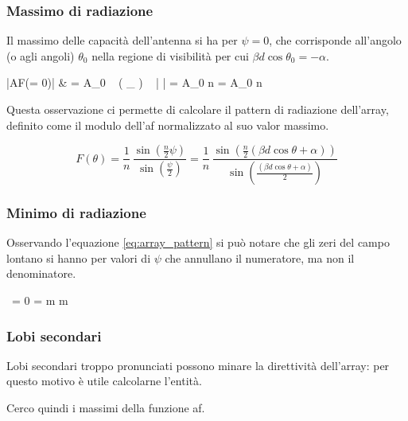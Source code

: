 		\subsubsection{Massimo di radiazione}
			Il massimo delle capacità dell'antenna si ha per $\psi = 0$, che corrisponde all'angolo (o agli angoli) $\theta_0$ nella regione di visibilità per cui $\beta d \cos \theta_0 = -\alpha$.

			\begin{esp}
				|AF(\psi = 0)|
					& = A_0
						~ \left( \lim_{\psi {}} \frac{ \sin(\frac{n}{2} \psi) }{ \sin(\frac{\psi}{2}) } \right)
						~ \left| \frac{ e^{\jmath \frac{n-1}{2} \psi} }{ e^{\jmath \psi} } \right|
						= A_0 \cdot n \cdot 1 = A_0 \cdot n
			\end{esp}

			Questa osservazione ci permette di calcolare il pattern di radiazione dell'array, definito come il modulo dell'\gls{af} normalizzato al suo valor massimo.

			\begin{equation} \label{eq:array_pattern}
				F(\theta)
					= \frac{1}{n} \, 
					= \frac{1}{n} \, \frac{
						\sin \left(
							\frac{n}{2} (\beta d \cos \theta + \alpha)
						\right)
					}{
						\sin \left(
							\frac{(\beta d \cos \theta + \alpha)}{2}
						\right)
					}
			\end{equation}

		\subsubsection{Minimo di radiazione}
			Osservando l'equazione \eqref{eq:array_pattern} si può notare che gli zeri del campo lontano si hanno per valori di $\psi$ che annullano il numeratore, ma non il denominatore.

			\begin{esp}
				 \, \frac{\sin(\frac{n}{2} \psi) }{ \sin( \frac{\psi}{2} ) } = 0
				\Leftrightarrow
					 \psi = \pm m \pi \quad \forall m \neq 0
			\end{esp}

		\subsubsection{Lobi secondari}
			Lobi secondari troppo pronunciati possono minare la direttività dell'array: per questo motivo è utile calcolarne l'entità.

			Cerco quindi i massimi della funzione \gls{af}.

